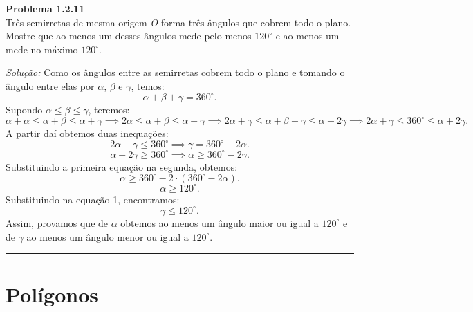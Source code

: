 \documentclass[a4paper, 11pt]{book}
\newenvironment{problem}[2][Problema] 
    { \begin{mdframed}[backgroundcolor=gray!20] \textbf{#1 #2} \\}
    {  \end{mdframed}}
\newenvironment{solution}
    {\textit{Solução:}}
    {}
\begin{document}
\begin{problem}{1.2.11}
    \label{prob:1.2.11}
    Três semirretas de mesma origem \textit{O} forma três ângulos que cobrem todo o plano. Mostre que ao menos um desses ângulos mede pelo menos $120^\circ$ e ao menos um mede no máximo $120^\circ$.
\end{problem}
\begin{solution}
    Como os ângulos entre as semirretas cobrem todo o plano e tomando o ângulo entre elas por $\alpha$,  $\beta$ e  $\gamma$, temos:
     \[
    \alpha + \beta + \gamma = 360^\circ
    .\] 
    Supondo $\alpha \le \beta \le \gamma$, teremos:
    \[
    \alpha + \alpha \le \alpha + \beta \le \alpha + \gamma \implies 2\alpha \le \alpha + \beta \le \alpha + \gamma \implies 2\alpha + \gamma \le \alpha + \beta + \gamma \le \alpha + 2\gamma \implies 2\alpha + \gamma \le 360^\circ \le \alpha + 2\gamma
    .\] 
    A partir daí obtemos duas inequações:
    \[
    2\alpha + \gamma \le 360^\circ \implies \gamma = 360^\circ - 2\alpha
    .\] 
    \[
    \alpha + 2\gamma \ge 360^\circ \implies \alpha \ge 360^\circ - 2\gamma
    .\] 
    Substituindo a primeira equação na segunda, obtemos:
    \[
        \alpha \ge 360^\circ - 2\cdot\left( 360^\circ - 2\alpha \right) 
    .\] 
    \[
    \alpha \ge 120^\circ
    .\] 
    Substituindo \alpha na equação 1, encontramos:
    \[
    \gamma \le 120^\circ
    .\] 
    Assim, provamos que de $\alpha$ obtemos ao menos um ângulo maior ou igual a $120^\circ$ e de $\gamma$ ao menos um ângulo menor ou igual a $120^\circ$.

\noindent\rule{7in}{2.8pt}

\section{Polígonos}


\end{solution}
\end{document}
